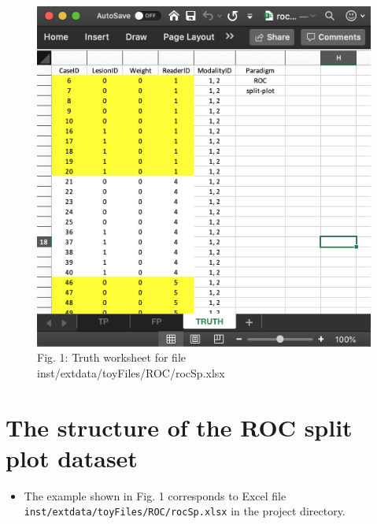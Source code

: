 \documentclass[]{book}
\providecommand{\tightlist}{%
  \setlength{\itemsep}{0pt}\setlength{\parskip}{0pt}}
\begin{document}
\begin{figure}

{\centering \includegraphics[width=0.5\linewidth,height=0.2\textheight]{images/rocSpTruth} 

}

\caption{Fig. 1: Truth worksheet for file inst/extdata/toyFiles/ROC/rocSp.xlsx}\label{fig:unnamed-chunk-1}
\end{figure}

\hypertarget{the-structure-of-the-roc-split-plot-dataset}{%
\section{The structure of the ROC split plot dataset}\label{the-structure-of-the-roc-split-plot-dataset}}

\begin{itemize}
\tightlist
\item
  The example shown in Fig. 1 corresponds to Excel file \texttt{inst/extdata/toyFiles/ROC/rocSp.xlsx} in the project directory.
\end{itemize}
\end{document}
